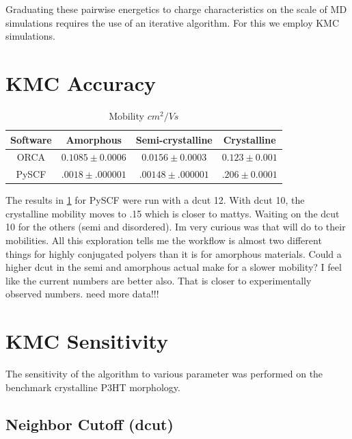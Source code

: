 Graduating these pairwise energetics to charge characteristics on the scale of MD simulations
requires the use of an iterative algorithm. For this we employ KMC simulations.

\section{KMC Accuracy}

\begin{table}[ht]
    \caption{Mobility $cm^{2}/Vs$} %
\centering %
\begin{tabular}{c c c c} %
\hline\hline %
Software & Amorphous & Semi-crystalline & Crystalline \\ [0.5ex] %
\hline %
    ORCA & $0.1085 \pm 0.0006$ & $0.0156 \pm 0.0003$ & $0.123 \pm 0.001$ \\ %
PySCF & $.0018 \pm .000001$ & $.00148 \pm .000001$ & $.206 \pm 0.0001$ \\ [1ex] %
\hline %
\end{tabular}
\label{table:nonlin} %
\end{table}

The results in \ref{table:nonlin} for PySCF were run with a dcut 12. With dcut 10, the crystalline mobility
moves to .15 which is closer to mattys. Waiting on the dcut 10 for the others (semi and disordered). Im very
curious was that will do to their mobilities. All this exploration tells me the workflow is almost two
different things for highly conjugated polyers than it is for amorphous materials. Could a higher dcut in the
semi and amorphous actual make for a slower mobility? I feel like the current numbers are better also. That is
closer to experimentally observed numbers. need more data!!!


\section{KMC Sensitivity}

The sensitivity of the algorithm to various parameter was performed on the benchmark crystalline P3HT
morphology.

\subsection{Neighbor Cutoff (dcut)}

